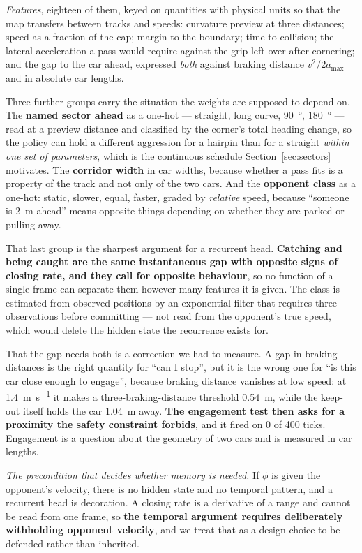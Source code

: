\documentclass[letterpaper, 10 pt, conference]{ieeeconf}
\begin{document}
\emph{Features}, eighteen of them, keyed on quantities with physical units so
that the map transfers between tracks and speeds: curvature preview at three
distances;
speed as a fraction of the cap; margin to the boundary; time-to-collision;
the lateral acceleration a pass would require against the grip left over after
cornering; and the gap to the car ahead, expressed \emph{both} against braking
distance $v^2/2a_{\max}$ and in absolute car lengths.

Three further groups carry the situation the weights are supposed to depend on.
The \textbf{named sector ahead} as a one-hot --- straight, long curve,
\SI{90}{\degree}, \SI{180}{\degree} --- read at a preview distance and
classified by the corner's total heading change, so the policy can hold a
different aggression for a hairpin than for a straight \emph{within one set of
parameters}, which is the continuous schedule Section~\ref{sec:sectors}
motivates. The \textbf{corridor width} in car widths, because whether a pass
fits is a property of the track and not only of the two cars. And the
\textbf{opponent class} as a one-hot: static, slower, equal, faster, graded by
\emph{relative} speed, because ``someone is \SI{2}{\meter} ahead'' means
opposite things depending on whether they are parked or pulling away.

That last group is the sharpest argument for a recurrent head. \textbf{Catching
and being caught are the same instantaneous gap with opposite signs of closing
rate, and they call for opposite behaviour}, so no function of a single frame
can separate them however many features it is given. The class is estimated
from observed positions by an exponential filter that requires three
observations before committing --- not read from the opponent's true speed,
which would delete the hidden state the recurrence exists for.

That the gap needs both is a correction we had to measure. A gap in braking
distances is the right quantity for ``can I stop'', but it is the wrong one for
``is this car close enough to engage'', because braking distance vanishes at low
speed: at \SI{1.4}{\meter\per\second} it makes a three-braking-distance
threshold \SI{0.54}{\meter}, while the keep-out itself holds the car
\SI{1.04}{\meter} away. \textbf{The engagement test then asks for a proximity
the safety constraint forbids}, and it fired on 0 of 400 ticks. Engagement is a
question about the geometry of two cars and is measured in car lengths.

\emph{The precondition that decides whether memory is needed.} If $\phi$ is
given the opponent's velocity, there is no hidden state and no temporal pattern,
and a recurrent head is decoration. A closing rate is a derivative of a range
and cannot be read from one frame, so \textbf{the temporal argument requires
deliberately withholding opponent velocity}, and we treat that as a design
choice to be defended rather than inherited.
\end{document}

